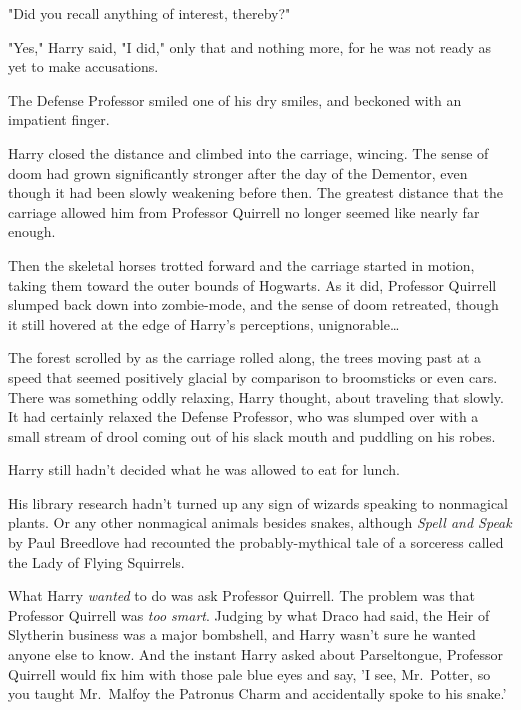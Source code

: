 "Did you recall anything of interest, thereby?"

"Yes," Harry said, "I did," only that and nothing more, for he was not ready as yet to make accusations.

The Defense Professor smiled one of his dry smiles, and beckoned with an impatient finger.

Harry closed the distance and climbed into the carriage, wincing. The sense of doom had grown significantly stronger after the day of the Dementor, even though it had been slowly weakening before then. The greatest distance that the carriage allowed him from Professor Quirrell no longer seemed like nearly far enough.

Then the skeletal horses trotted forward and the carriage started in motion, taking them toward the outer bounds of Hogwarts. As it did, Professor Quirrell slumped back down into zombie-mode, and the sense of doom retreated, though it still hovered at the edge of Harry's perceptions, unignorable{\ldots}

The forest scrolled by as the carriage rolled along, the trees moving past at a speed that seemed positively glacial by comparison to broomsticks or even cars. There was something oddly relaxing, Harry thought, about traveling that slowly. It had certainly relaxed the Defense Professor, who was slumped over with a small stream of drool coming out of his slack mouth and puddling on his robes.

Harry still hadn't decided what he was allowed to eat for lunch.

His library research hadn't turned up any sign of wizards speaking to nonmagical plants. Or any other nonmagical animals besides snakes, although \emph{Spell and Speak} by Paul Breedlove had recounted the probably-mythical tale of a sorceress called the Lady of Flying Squirrels.

What Harry \emph{wanted} to do was ask Professor Quirrell. The problem was that Professor Quirrell was \emph{too smart}. Judging by what Draco had said, the Heir of Slytherin business was a major bombshell, and Harry wasn't sure he wanted anyone else to know. And the instant Harry asked about Parseltongue, Professor Quirrell would fix him with those pale blue eyes and say, 'I see, Mr.~Potter, so you taught Mr.~Malfoy the Patronus Charm and accidentally spoke to his snake.'

